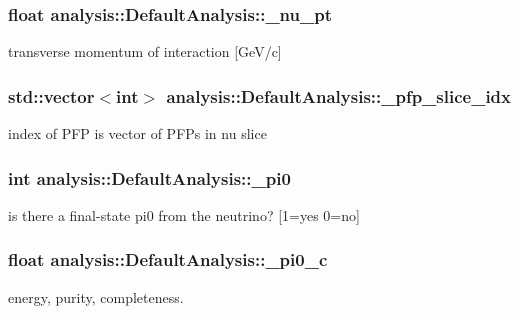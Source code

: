 \subsubsection[{\texorpdfstring{\+\_\+nu\+\_\+pt}{_nu_pt}}]{\setlength{\rightskip}{0pt plus 5cm}float analysis\+::\+Default\+Analysis\+::\+\_\+nu\+\_\+pt\hspace{0.3cm}{\ttfamily [private]}}\hypertarget{classanalysis_1_1DefaultAnalysis_a901956985dfd610c781bedf7bfc9754a}{}\label{classanalysis_1_1DefaultAnalysis_a901956985dfd610c781bedf7bfc9754a}
transverse momentum of interaction \mbox{[}Ge\+V/c\mbox{]} 
\subsubsection[{\texorpdfstring{\+\_\+pfp\+\_\+slice\+\_\+idx}{_pfp_slice_idx}}]{\setlength{\rightskip}{0pt plus 5cm}std\+::vector$<$int$>$ analysis\+::\+Default\+Analysis\+::\+\_\+pfp\+\_\+slice\+\_\+idx\hspace{0.3cm}{\ttfamily [private]}}\hypertarget{classanalysis_1_1DefaultAnalysis_acbf0c279993cbefca72f38bc5e9f6627}{}\label{classanalysis_1_1DefaultAnalysis_acbf0c279993cbefca72f38bc5e9f6627}
index of P\+FP is vector of P\+F\+Ps in nu slice 
\subsubsection[{\texorpdfstring{\+\_\+pi0}{_pi0}}]{\setlength{\rightskip}{0pt plus 5cm}int analysis\+::\+Default\+Analysis\+::\+\_\+pi0\hspace{0.3cm}{\ttfamily [private]}}\hypertarget{classanalysis_1_1DefaultAnalysis_a2a00585c8fd4fcc84f42d50f271ff78a}{}\label{classanalysis_1_1DefaultAnalysis_a2a00585c8fd4fcc84f42d50f271ff78a}
is there a final-\/state pi0 from the neutrino? \mbox{[}1=yes 0=no\mbox{]} 
\subsubsection[{\texorpdfstring{\+\_\+pi0\+\_\+c}{_pi0_c}}]{\setlength{\rightskip}{0pt plus 5cm}float analysis\+::\+Default\+Analysis\+::\+\_\+pi0\+\_\+c\hspace{0.3cm}{\ttfamily [private]}}\hypertarget{classanalysis_1_1DefaultAnalysis_a255069926e7e8a83629b9dac19bf7473}{}\label{classanalysis_1_1DefaultAnalysis_a255069926e7e8a83629b9dac19bf7473}
energy, purity, completeness. 
